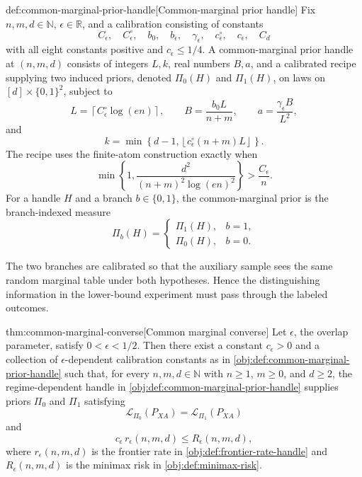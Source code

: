 \documentclass[11pt]{article}
\begin{document}
\begin{definitionv}{def:common-marginal-prior-handle}[Common-marginal prior handle]
Fix \(n,m,d\in\mathbb N\), \(\epsilon\in\mathbb R\), and a calibration consisting of constants
\[
C_\epsilon,\quad C_\epsilon^\circ,\quad b_0,\quad b_\epsilon,\quad
\gamma_\epsilon,\quad c_\epsilon^\circ,\quad c_\epsilon,\quad C_d
\]
with all eight constants positive and \(c_\epsilon\le 1/4\).  A common-marginal prior handle at \((n,m,d)\) consists of integers \(L,k\), real numbers \(B,a\), and a calibrated recipe supplying two induced priors, denoted \(\Pi_0(H)\) and \(\Pi_1(H)\), on laws on \([d]\times\{0,1\}^2\), subject to
\[
L=\left\lceil C_\epsilon^\circ \log(en)\right\rceil,\qquad
B=\frac{b_0L}{n+m},\qquad
a=\frac{\gamma_\epsilon B}{L^2},
\]
and
\[
k=\min\left\{d-1,\left\lfloor c_\epsilon^\circ(n+m)L\right\rfloor\right\}.
\]
The recipe uses the finite-atom construction exactly when
\[
\min\left\{1,\frac{d^2}{(n+m)^2\log(en)^2}\right\}
>
\frac{C_\epsilon}{n}.
\]
For a handle \(H\) and a branch \(b\in\{0,1\}\), the common-marginal prior is the branch-indexed measure
\[
\Pi_b(H)=
\begin{cases}
\Pi_1(H), & b=1,\\
\Pi_0(H), & b=0.
\end{cases}
\]
\end{definitionv}

The two branches  are calibrated so that the auxiliary sample sees the same random marginal table under both hypotheses. Hence the distinguishing information in the lower-bound experiment must pass through the labeled outcomes.

\begin{theoremv}{thm:common-marginal-converse}[Common marginal converse]
Let \(\epsilon\), the overlap parameter, satisfy \(0<\epsilon<1/2\).  Then there exist a constant \(c_\epsilon>0\) and a collection of \(\epsilon\)-dependent calibration constants as in \cref{obj:def:common-marginal-prior-handle} such that, for every \(n,m,d\in\mathbb N\) with \(n\ge1\), \(m\ge0\), and \(d\ge2\), the regime-dependent handle in \cref{obj:def:common-marginal-prior-handle} supplies priors \(\Pi_0\) and \(\Pi_1\) satisfying
\[
\mathcal L_{\Pi_0}(P_{XA})=\mathcal L_{\Pi_1}(P_{XA})
\]
and
\[
c_\epsilon\, r_\epsilon(n,m,d)\le R_\epsilon(n,m,d),
\]
where \(r_\epsilon(n,m,d)\) is the frontier rate in \cref{obj:def:frontier-rate-handle} and \(R_\epsilon(n,m,d)\) is the minimax risk in \cref{obj:def:minimax-risk}.
\end{theoremv}
\end{document}
